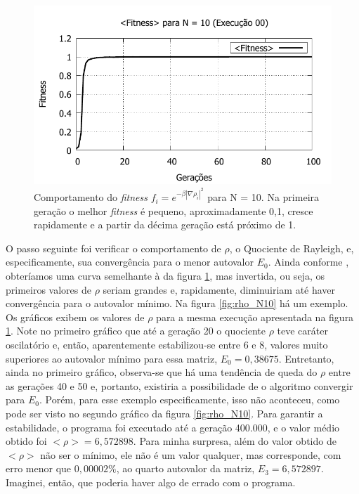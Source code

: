 	\begin{figure}[htbp]
		\centering
			\includegraphics{figs/resultados/fitnessGrad/N10_00_fitness.pdf}
			\caption{Comportamento do \textsl{fitness} $f_i = e^{-\beta |\nabla \rho_i|^2}$ para N = 10. Na primeira geração o melhor \textit{fitness} é pequeno, aproximadamente 0,1, cresce rapidamente e a partir da décima geração está próximo de 1.}
		\label{fig:compFitnessTipo1N10}
	\end{figure}
	
	O passo seguinte foi verificar o comportamento de $\rho$, o Quociente de Rayleigh, e, especificamente, sua convergência para o menor autovalor $E_0$. Ainda conforme \cite{metodo2004}, obteríamos uma curva semelhante à da figura \ref{fig:compFitnessTipo1N10}, mas invertida, ou seja, os primeiros valores de $\rho$ seriam grandes e, rapidamente, diminuiriam até haver convergência para o autovalor mínimo. Na figura \ref{fig:rho_N10} há um exemplo.	Os gráficos exibem os valores de $\rho$ para a mesma execução apresentada na figura \ref{fig:compFitnessTipo1N10}. Note no primeiro gráfico que até a geração 20 o quociente $\rho$ teve caráter oscilatório e, então, aparentemente estabilizou-se entre 6 e 8, valores muito superiores ao autovalor mínimo para essa matriz, $E_0 = 0,38675$. Entretanto, ainda no primeiro gráfico, observa-se que há uma tendência de queda do $\rho$ entre as gerações 40 e 50 e, portanto, existiria a possibilidade de o algoritmo convergir para $E_0$. Porém, para esse exemplo especificamente, isso não aconteceu, como pode ser visto no segundo gráfico da figura \ref{fig:rho_N10}. Para garantir a estabilidade, o programa foi executado até a geração 400.000, e o valor médio obtido foi $<\rho> = 6,572898$. Para minha surpresa, além do valor obtido de $<\rho>$ não ser o mínimo, ele não é um valor qualquer, mas corresponde, com erro menor que $0,00002\%$, ao quarto autovalor da matriz, $E_3 = 6,572897$. Imaginei, então, que poderia haver algo de errado com o programa. 
	
